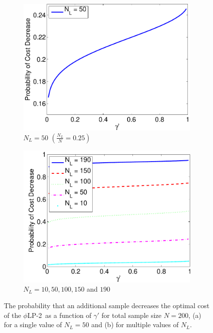 \documentclass[11pt]{article}
\newcommand{\plp}{$\phi$LP-2}
\begin{document}
\begin{figure}
	\centering
	\begin{subfigure}{.5\textwidth}
	   \includegraphics[width=\textwidth]{images/prob_dec_cost_v_gammaprime_no_context}
	   \caption{
			$N_L=50$ $\left(\frac{N_L}{N} = 0.25\right)$
		}
	   \label{fig:prob_cost_decrease_gp}
	\end{subfigure}%
	\begin{subfigure}{.5\textwidth}
	   \includegraphics[width=\textwidth]{images/prob_dec_cost_v_gammaprime_no_context_multiple}
	   \caption{
			$N_L=10,50,100,150$ and $190$
		}
	   \label{fig:prob_cost_decrease_gp_multiple}
	\end{subfigure}%
	\caption{The probability that an additional sample decreases the optimal cost of the \plp\ as a function of $\gamma'$ for total sample size $N = 200$, (a) for a single value of $N_L = 50$ and (b) for multiple values of $N_L$.}
\end{figure}
\end{document}

